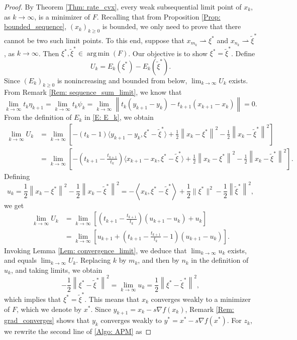 \documentclass[pdflatex,sn-mathphys-num]{sn-jnl}
\theoremstyle{thmstyleone}
\theoremstyle{thmstyletwo}
\theoremstyle{thmstylethree}
\DeclareMathOperator*{\argmin}{arg\,min}
\begin{document}
\begin{proof}
By Theorem \ref{Thm: rate_cvx}, every weak subsequential limit point of $x_k$, as $k\to\infty$, is a minimizer of $F$. Recalling that from Proposition \ref{Prop: bounded_sequence}, $(x_k)_{k\ge 0}$ is bounded, we only need to prove that there cannot be two such limit points. To this end, suppose that $x_{m_k}\rightharpoonup \xi^*$ and $x_{n_k}\rightharpoonup\widetilde{\xi}^*$, as $k\to\infty$. Then $\xi^*,\widetilde{\xi}^*\in\argmin(F)$. Our objective is to show $\xi^* = \widetilde{\xi}^*$. Define
$$ U_k = E_k(\xi^*) - E_k(\widetilde{\xi}^*). $$
Since $(E_k)_{k\ge 0}$ is nonincreasing and bounded from below, $\lim_{k\to\infty} U_k$ exists. From Remark \ref{Rem: sequence_sum_limit}, we know that    
$$ \lim_{k\to\infty} t_k \eta_{k+1} =  \lim_{k\to\infty} t_k\psi_k = \lim_{k\to\infty} \left\| t_k(y_{k+1}-y_k) - t_{k+1}(x_{k+1}-x_k) \right\| = 0. $$
From the definition of $E_k$ in \eqref{E: E_k}, we obtain
\begin{align*}
 \lim_{k\to\infty} U_k 
&= \lim_{k\to\infty}\left[ -(t_k-1)\langle y_{k+1}-y_k, \xi^* - \widetilde{\xi}^* \rangle + \frac{1}{2}\left\| x_k - \xi^* \right\|^2 - \frac{1}{2}\left\| x_k - \widetilde{\xi}^* \right\|^2  \right] \\
&= \lim_{k\to\infty}\left[ -\left(t_{k+1}-\frac{t_{k+1}}{t_k}\right)\langle x_{k+1}-x_k, \xi^* - \widetilde{\xi}^* \rangle + \frac{1}{2}\left\| x_k - \xi^* \right\|^2 - \frac{1}{2}\left\| x_k - \widetilde{\xi}^* \right\|^2 \right].
\end{align*}
Defining
$$ u_k = \frac{1}{2}\left\| x_k - \xi^* \right\|^2 - \frac{1}{2}\left\| x_k - \widetilde{\xi}^* \right\|^2 = -\left\langle x_k, \xi^* - \widetilde{\xi}^* \right\rangle + \frac{1}{2}\| \xi^* \|^2 - \frac{1}{2}\left\| \widetilde{\xi}^* \right\|^2, $$
we get
\begin{align*}
\lim_{k\to\infty} U_k 
&= \lim_{k\to\infty}\left[ \left(t_{k+1}-\frac{t_{k+1}}{t_k}\right)(u_{k+1}-u_k) + u_k \right] \\
&= \lim_{k\to\infty}\left[ u_{k+1} + \left(t_{k+1}-\frac{t_{k+1}}{t_k}-1\right)(u_{k+1}-u_k) \right].
\end{align*}
Invoking Lemma \ref{Lem: convergence_limit}, we deduce that $\lim_{k\to\infty}u_k$ exists, and equals $\lim_{k\to\infty}U_k$. Replacing $k$ by $m_k$, and then by $n_k$ in the definition of $u_k$, and taking limits, we obtain
$$ -\frac{1}{2}\left\| \xi^* - \widetilde{\xi}^* \right\|^2 = \lim_{k\to\infty} u_k = \frac{1}{2}\left\| \xi^* - \widetilde{\xi}^* \right\|^2, $$
which implies that $\xi^* = \widetilde{\xi}^*$. This means that $x_k$ converges weakly to a minimizer of $F$, which we denote by $x^*$. Since $y_{k+1}=x_k-s\nabla f(x_k)$, Remark \ref{Rem: grad_converges} shows that $y_k$ converges weakly to $y^*=x^*-s\nabla f(x^*)$. For $z_k$, we rewrite the second line of \eqref{Algo: APM} as

\end{proof}
\end{document}
